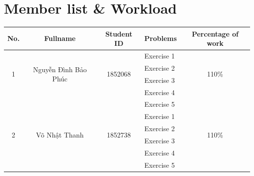 \documentclass[a4paper]{article}
\numberwithin{equation}{section}
\begin{document}

\newpage
\tableofcontents
\newpage


\section*{Member list \& Workload}


\begin{center}
  \begin{tabular}{|c|c|c|l|c|}
    \hline
    \textbf{No.}       & \textbf{Fullname}                      & \textbf{Student ID}      & \textbf{Problems}              & \textbf{Percentage of work} \\
    \hline
    \multirow{4}{*}{1} & \multirow{4}{*}{Nguyễn Đình Bảo Phúc} & \multirow{4}{*}{1852068} & \textendash{} Exercise 1    & \multirow{4}{*}{110\%}      \\
                       &                                        &                          & \textendash{} Exercise 2    &                             \\
                       &                                        &                          & \textendash{} Exercise 3    &                             \\
                       &                                        &                          & \textendash{} Exercise 4       &                             \\
                       &                                        &                          & \textendash{} Exercise 5    &                             \\
    \hline
    \multirow{4}{*}{2} & \multirow{4}{*}{Võ Nhật Thanh}            & \multirow{4}{*}{1852738} & \textendash{} Exercise 1    & \multirow{4}{*}{110\%}      \\
                       &                                        &                          & \textendash{} Exercise 2 &                             \\
                       &                                        &                          & \textendash{} Exercise 3    &                             \\
                       &                                        &                          & \textendash{} Exercise 4          &                             \\
                       &                                        &                          & \textendash{} Exercise 5    &                             \\

\end{tabular}
\end{center}
\end{document}

